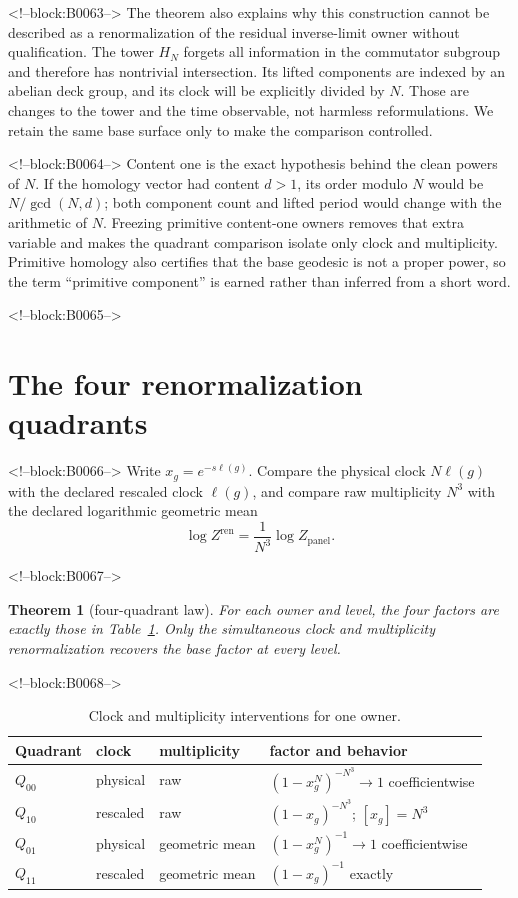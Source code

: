 \documentclass[11pt]{article}
\newtheorem{theorem}{Theorem}[section]
\theoremstyle{definition}
\theoremstyle{remark}
\begin{document}
<!--block:B0063-->
The theorem also explains why this construction cannot be described as a renormalization of the residual inverse-limit owner without qualification. The tower $H_N$ forgets all information in the commutator subgroup and therefore has nontrivial intersection. Its lifted components are indexed by an abelian deck group, and its clock will be explicitly divided by $N$. Those are changes to the tower and the time observable, not harmless reformulations. We retain the same base surface only to make the comparison controlled.

<!--block:B0064-->
Content one is the exact hypothesis behind the clean powers of $N$. If the homology vector had content $d>1$, its order modulo $N$ would be $N/\gcd(N,d)$; both component count and lifted period would change with the arithmetic of $N$. Freezing primitive content-one owners removes that extra variable and makes the quadrant comparison isolate only clock and multiplicity. Primitive homology also certifies that the base geodesic is not a proper power, so the term ``primitive component'' is earned rather than inferred from a short word.

<!--block:B0065-->
\section{The four renormalization quadrants}

<!--block:B0066-->
Write $x_g=e^{-s\ell(g)}$. Compare the physical clock $N\ell(g)$ with the declared rescaled clock $\ell(g)$, and compare raw multiplicity $N^3$ with the declared logarithmic geometric mean
\[
\log Z^{\mathrm{ren}}=\frac1{N^3}\log Z_{\mathrm{panel}}.
\]

<!--block:B0067-->
\begin{theorem}[four-quadrant law]\label{thm:quadrants}
For each owner and level, the four factors are exactly those in Table~\ref{tab:quadrants}. Only the simultaneous clock and multiplicity renormalization recovers the base factor at every level.
\end{theorem}

<!--block:B0068-->
\begin{table}[ht]
\centering
\caption{Clock and multiplicity interventions for one owner.}
\label{tab:quadrants}
\begin{tabular}{llll}
\toprule
Quadrant & clock & multiplicity & factor and behavior\\
\midrule
$Q_{00}$ & physical & raw & $(1-x_g^N)^{-N^3}\to1$ coefficientwise\\
$Q_{10}$ & rescaled & raw & $(1-x_g)^{-N^3}$; $[x_g]=N^3$\\
$Q_{01}$ & physical & geometric mean & $(1-x_g^N)^{-1}\to1$ coefficientwise\\
$Q_{11}$ & rescaled & geometric mean & $(1-x_g)^{-1}$ exactly\\
\bottomrule
\end{tabular}
\end{table}
\end{document}

